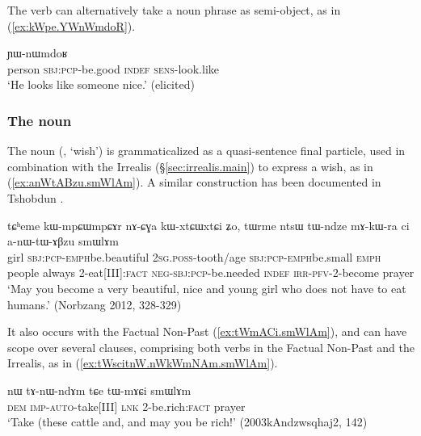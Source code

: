 The verb  can alternatively take a noun phrase as semi-object, as in (\ref{ex:kWpe.YWnWmdoR}).

\begin{exe}
	\ex \label{ex:kWpe.YWnWmdoR}
	\gll [tɯrme kɯ-pe ci] ɲɯ-nɯmdoʁ \\
	person \textsc{sbj}:\textsc{pcp}-be.good \textsc{indef} \textsc{sens}-look.like \\
	\glt `He looks like someone nice.' (elicited)
\end{exe}  



\subsubsection{The noun  } \label{sec:smWlAm.TAME}
The noun  (, `wish') is grammaticalized as a quasi-sentence final particle, used in combination with the Irrealis (§\ref{sec:irrealis.main}) to express a wish, as in (\ref{ex:anWtABzu.smWlAm}). A similar construction has been documented in Tshobdun \citep{jackson07irrealis}.

\begin{exe}
	\ex \label{ex:anWtABzu.smWlAm}
	\gll tɕʰeme kɯ-mpɕɯ\redp{}mpɕɤr nɤ-ɕɣa kɯ-xtɕɯ\redp{}xtɕi ʑo, tɯrme ntsɯ tɯ-ndze mɤ-kɯ-ra ci a-nɯ-tɯ-ɤβzu smɯlɤm \\
	girl \textsc{sbj}:\textsc{pcp}-\textsc{emph}\redp{}be.beautiful   \textsc{2sg}.\textsc{poss}-tooth/age  \textsc{sbj}:\textsc{pcp}-\textsc{emph}\redp{}be.small \textsc{emph}  people always 2-eat[III]:\textsc{fact} \textsc{neg}-\textsc{sbj}:\textsc{pcp}-be.needed \textsc{indef} \textsc{irr}-\textsc{pfv}-2-become prayer \\
	\glt `May you become a very beautiful, nice and young girl who does not have to eat humans.' (Norbzang 2012, 328-329)
\end{exe}

It also occurs with the Factual Non-Past (\ref{ex:tWmACi.smWlAm}), and can have scope over several clauses, comprising both verbs in the Factual Non-Past and the Irrealis, as in (\ref{ex:tWscitnW.nWkWmNAm.smWlAm}).

\begin{exe}
	\ex \label{ex:tWmACi.smWlAm}
	\gll  nɯ tɤ-nɯ-ndɤm tɕe tɯ-mɤɕi smɯlɤm  \\
	\textsc{dem} \textsc{imp}-\textsc{auto}-take[III] \textsc{lnk} 2-be.rich:\textsc{fact} prayer \\
	\glt `Take (these cattle and, and may you be rich!' (2003kAndzwsqhaj2, 142)
\end{exe}

